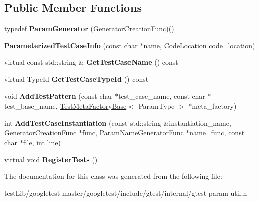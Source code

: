 \subsection*{Public Member Functions}
\begin{DoxyCompactItemize}
\item 
\mbox{\label{classtesting_1_1internal_1_1ParameterizedTestCaseInfo_a2f6a423f7ae8c7ac24b468538693aa26}} 
typedef {\bfseries Param\+Generator} (Generator\+Creation\+Func)()
\item 
\mbox{\label{classtesting_1_1internal_1_1ParameterizedTestCaseInfo_a6d19f368428260bd5c6e608b4d3fc6af}} 
{\bfseries Parameterized\+Test\+Case\+Info} (const char $\ast$name, \hyperlink{structtesting_1_1internal_1_1CodeLocation}{Code\+Location} code\+\_\+location)
\item 
\mbox{\label{classtesting_1_1internal_1_1ParameterizedTestCaseInfo_a8a9eafc7654b154165f131974397e200}} 
virtual const std\+::string \& {\bfseries Get\+Test\+Case\+Name} () const
\item 
\mbox{\label{classtesting_1_1internal_1_1ParameterizedTestCaseInfo_a16ed77e95a6042c722d0029744acfc33}} 
virtual Type\+Id {\bfseries Get\+Test\+Case\+Type\+Id} () const
\item 
\mbox{\label{classtesting_1_1internal_1_1ParameterizedTestCaseInfo_a3e557c888ec5e23b138c2ff254db15e5}} 
void {\bfseries Add\+Test\+Pattern} (const char $\ast$test\+\_\+case\+\_\+name, const char $\ast$test\+\_\+base\+\_\+name, \hyperlink{classtesting_1_1internal_1_1TestMetaFactoryBase}{Test\+Meta\+Factory\+Base}$<$ Param\+Type $>$ $\ast$meta\+\_\+factory)
\item 
\mbox{\label{classtesting_1_1internal_1_1ParameterizedTestCaseInfo_adefded091e3f20ac3a758029caea3eab}} 
int {\bfseries Add\+Test\+Case\+Instantiation} (const std\+::string \&instantiation\+\_\+name, Generator\+Creation\+Func $\ast$func, Param\+Name\+Generator\+Func $\ast$name\+\_\+func, const char $\ast$file, int line)
\item 
\mbox{\label{classtesting_1_1internal_1_1ParameterizedTestCaseInfo_a7e118820b3074ce70c0440e2e49a50a1}} 
virtual void {\bfseries Register\+Tests} ()
\end{DoxyCompactItemize}


The documentation for this class was generated from the following file\+:\begin{DoxyCompactItemize}
\item 
test\+Lib/googletest-\/master/googletest/include/gtest/internal/gtest-\/param-\/util.\+h\end{DoxyCompactItemize}
